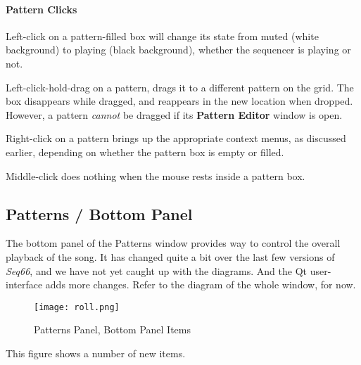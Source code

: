\paragraph{Pattern Clicks}
\label{paragraph:patterns_pattern_Clicks}

   Left-click on a pattern-filled box will change its state
   from muted (white background) to playing (black background), whether
   the sequencer is playing or not.

   Left-click-hold-drag on a pattern, drags it to a different
   pattern on the grid.
   The box disappears while dragged, and reappears in the new location when
   dropped.  However, a pattern \textsl{cannot} be dragged if its
   \textbf{Pattern Editor} window is open.

   Right-click on a pattern brings up the appropriate context menus, as
   discussed earlier, depending on whether the pattern box is empty or
   filled.

   Middle-click does nothing when the mouse rests inside a pattern box.

\subsection{Patterns / Bottom Panel}
\label{subsec:patterns_panel_bottom}

   The bottom panel of the Patterns window provides way to control the
   overall playback of the song.  It has changed quite a bit over the last few
   versions of \textsl{Seq66}, and we have not yet caught up with the
   diagrams. And the Qt user-interface adds more changes.
   Refer to the diagram of the whole window, for now.

\begin{figure}[H]
   \centering 
   \texttt{[image: roll.png]}
   \caption{Patterns Panel, Bottom Panel Items}
   \label{fig:pattern_window_bottom_panel_items}
\end{figure}

   This figure shows a number of new items.

